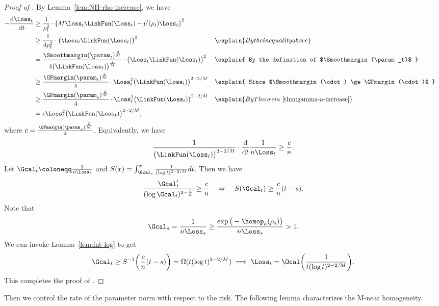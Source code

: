\begin{proof}[Proof of ]
By Lemma~\ref{lem:NH-rho-increase}, we have
\begin{align*}
- \frac{\mathrm{d} \Loss_t}{\mathrm{d} t} 
& \ge \frac{1}{\rho_t^2} \cdot \big(  M \Loss_t \LinkFun(\Loss_t) - p^\prime (\rho_t)\Loss_t \big)^2\\ 
& \ge \frac{1}{4\rho_t^2} \cdot \big( \Loss_t \LinkFun(\Loss_t)\big)^2 &&\explain{ By the inequality above } \\ 
& = \frac{\Smoothmargin(\param_t)^{\frac{2}{M}}}{4\big(\LinkFun(\Loss_t)\big)^{\frac{2}{M}}} \cdot \big( \Loss_t \LinkFun(\Loss_t)\big)^2 &&\explain{ By the definition of $\Smoothmargin(\param_t)$ } \\
& \ge \frac{\GFmargin(\param_t)^{\frac{2}{M}}}{4} \cdot  \Loss_t^2\big( \LinkFun(\Loss_t)\big)^{2-2/M} &&\explain{ Since $\Smoothmargin(\cdot) \ge \GFmargin(\cdot)$ } \\ 
&\ge \frac{\GFmargin(\param_s)^{\frac{2}{M}}}{4}  \cdot  \Loss_t^2\big( \LinkFun(\Loss_t)\big)^{2-2/M} &&\explain{ By Theorem~\ref{thm:gamma-a-increase} }\\ 
& = c \Loss_t^2\big( \LinkFun(\Loss_t)\big)^{2-2/M},
\end{align*}
where $c = \frac{\GFmargin(\param_s)^{\frac{2}{M}}}{4}  $. Equivalently, we have
\[
    \frac{1}{\big( \LinkFun(\Loss_t)\big)^{2-2/M} } \cdot \frac{\mathrm{d}}{\mathrm{d}t} \frac{1}{n\Loss_t} \ge \frac{c}{n}. 
\]
Let $\Gcal_t \coloneqq \frac{1}{n\Loss_t}$ and $S(x) = \int_{\Gcal_s}^x \frac{1}{(\log t)^{2-2/M}} dt$. Then we have 
\[
    \frac{\Gcal_t^\prime }{(\log \Gcal_t)^{2-\frac{2}{L}}} \ge \frac{c}{n} \quad \Rightarrow \quad S(\Gcal_t) \ge \frac{c}{n}(t-s).
\]
Note that
\begin{align*}
    \Gcal_s = \frac{1}{n \Loss_s} \ge \frac{\exp\big(-\homop_a(\rho_s)\big)}{n\Loss_s} >1. 
\end{align*}
We can invoke Lemma~\ref{lem:int-log} to get 
\[
    \Gcal_t \ge S^{-1} \bigg( \frac{c}{n}(t-s) \bigg) = \Omega(t(\log t) ^{2-2/M}) \implies \Loss_t = \Ocal \bigg( \frac{1}{t(\log t)^{2-2/M}} \bigg).
\]
This completes the proof of .  
\end{proof}

Then we control the rate of the parameter norm with respect to the risk. The following lemma characterizes the M-near homogeneity. 


